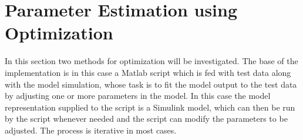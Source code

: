 \section{Parameter Estimation using Optimization}\label{sec:parameterEstimationUsingOptimization}
In this section two methods for optimization will be investigated. The base of the implementation is in this case a Matlab script which is fed with test data along with the model simulation, whose task is to fit the model output to the test data by adjusting one or more parameters in the model. In this case the model representation supplied to the script is a Simulink model, which can then be run by the script whenever needed and the script can modify the parameters to be adjusted. The process is iterative in most cases.